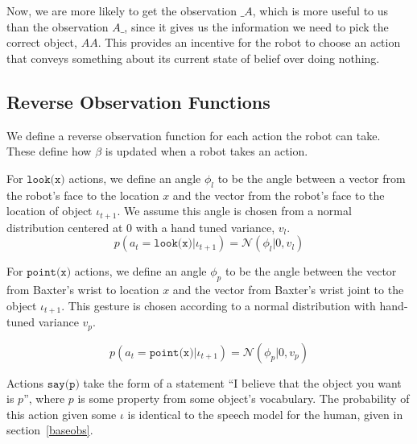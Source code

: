 \documentclass[conference]{IEEEtran}
\begin{document}
Now, we are more likely to get the observation $\_A$, which is more useful to us than the observation $A\_$, since it gives us the information we need to pick the correct object, $AA$. This provides an incentive for the robot to choose an action that conveys something about its current state of belief over doing nothing. 

\subsection{Reverse Observation Functions}

We define a reverse observation function for each action the robot can take. These define how $\beta$ is updated when a robot takes an action. 

For $\texttt{look(x)}$ actions, we define an angle $\phi_l$ to be the angle between a vector from the robot's face to the location $x$ and the vector from the robot's face to the location of object $\iota_{t+1}$. We assume this angle is chosen from a normal distribution centered at 0 with a hand tuned variance, $v_l$. 
$$p(a_{t} = \texttt{look(x)} | \iota_{t+1}) = \mathcal{N}(\phi_l | 0, v_{l})$$

For $\texttt{point(x)}$ actions, we define an angle $\phi_p$ to be the angle between the vector from Baxter's wrist to location $x$ and the vector from Baxter's wrist joint to the object $\iota_{t+1}$. This gesture is chosen according to a normal distribution with hand-tuned variance $v_p$. 

$$p(a_{t} = \texttt{point(x)} | \iota_{t+1}) = \mathcal{N}(\phi_p | 0, v_{p})$$

Actions $\texttt{say(p)}$ take the form of a statement ``I believe that the object you want is $p$'', where $p$ is some property from some object's vocabulary. The probability of this action given some $\iota$ is identical to the speech model for the human, given in section~\ref{baseobs}. 

\newpage



\end{document}

